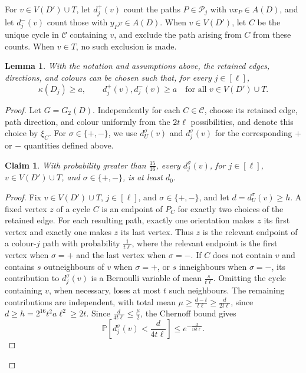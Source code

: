 \documentclass[11pt,a4paper]{article}
\newtheorem{lemma}[lemma]{Lemma}
\newtheorem{claim}{Claim}
\theoremstyle{remark}
\numberwithin{equation}{section}
\newcommand{\Prob}{\mathbb{P}}
\newcommand{\calP}{\mathcal{P}}
\newcommand{\calC}{\mathcal{C}}
\begin{document}
	For $v\in V(D')\cup T$, let $d_j^+(v)$ count the paths $P\in\calP_j$ with $vx_P\in A(D)$, and let
	$d_j^-(v)$ count those with $y_Pv\in A(D)$.
	When $v\in V(D')$, let $C$ be the unique cycle in $\calC$ containing $v$, and exclude the path arising from $C$ from these counts. When $v\in T$, no such exclusion is made.
	\begin{lemma}\label{lem:selection}
		With the notation and assumptions above, the retained edges,
		directions, and colours can be chosen such that, for every
		$j\in[\ell]$,
		\[
		\kappa(D_j)\ge a,\qquad
		d_j^+(v),d_j^-(v)\ge a
		\quad\text{for all }v\in V(D')\cup T.
		\]
	\end{lemma}
	\begin{proof}
		Let $G=G_2(D)$. Independently for each $C\in\calC$, choose its retained edge,
		path direction, and colour uniformly from the $2t\ell$ possibilities, and denote
		this choice by $\xi_C$. For $\sigma\in\{+,-\}$, we use $d_U^\sigma(v)$ and
		$d_j^\sigma(v)$ for the corresponding $+$ or $-$ quantities defined above.
		\begin{claim}\label{cl:neighbours}
			With probability greater than $\frac{15}{16}$, every $d_j^\sigma(v)$, for $j\in[\ell]$,
			$v\in V(D')\cup T$, and $\sigma\in\{+,-\}$, is at least $d_0$.
		\end{claim}
		\begin{proof}
			Fix $v\in V(D')\cup T$, $j\in[\ell]$, and $\sigma\in\{+,-\}$, and let
			$d=d_U^\sigma(v)\ge h$. A fixed vertex $z$ of a cycle $C$ is an endpoint of $P_C$
			for exactly two choices of the retained edge. For each resulting path, exactly one
			orientation makes $z$ its first vertex and exactly one makes $z$ its last vertex.
			Thus $z$ is the relevant endpoint of a colour-$j$ path with probability $\frac{1}{t\ell}$,
			where the relevant endpoint is the first vertex when $\sigma=+$ and the last vertex
			when $\sigma=-$. If $C$ does not contain $v$ and contains $s$ outneighbours of
			$v$ when $\sigma=+$, or $s$ inneighbours when $\sigma=-$, its contribution to
			$d_j^\sigma(v)$ is a Bernoulli variable of mean $\frac{s}{t\ell}$.
			Omitting the cycle containing $v$, when necessary, loses at most $t$ such
			neighbours. The remaining contributions are independent, with total mean
			$\mu\ge\frac{d-t}{t\ell}\ge \frac{d}{2t\ell}$, since $d\ge h=2^{16}t^2a\ell^2\ge2t$.
			Since $\frac{d}{4t\ell}\le\frac{\mu}{2}$, the Chernoff bound gives
			\begin{equation}\label{eq:vertex-tail}
				\Prob\!\left[d_j^\sigma(v)<\frac{d}{4t\ell}\right]\le e^{-\frac{d}{16t\ell}}.
			\end{equation}
			

\end{proof}
\end{proof}
\end{document}
